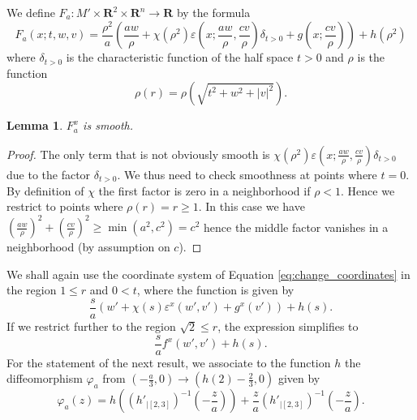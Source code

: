 \documentclass[reqno]{amsart}
\newcommand{\THOMAS}[1]%
	{\begin{quotation}{\footnotesize\textcolor{brown}{\textbf{Thomas:} #1}}\end{quotation}}
\renewcommand{\epsilon}{\varepsilon}
\theoremstyle{theorem}
\newtheorem{lemma}[corollary]{Lemma}
\theoremstyle{remark}
\theoremstyle{definition}
\DeclareMathOperator{\supp}{supp}
\newcommand{\R}{\mathbf{R}}
\begin{document}
We define $F_a:M' \times \R^2 \times \R^n \to \R$ by the formula
\[F_a(x;t,w,v)=\frac{\rho^2}{a}\left(\frac{aw}{\rho} + \chi(\rho^2)\epsilon\left(x;\frac{aw}{\rho},\frac{cv}{\rho}\right)\delta_{t>0}+g\left(x;\frac{cv}{\rho}\right)\right)+ h(\rho^2)\]
where $\delta_{t>0}$ is the characteristic function of the half space $t > 0 $ and $\rho$ is the function
\[\rho(r)=\rho\left(\sqrt{t^2+w^2+|v|^2}\right).\]






\begin{lemma} \label{lem:compact_support}
$F^x_a$ is smooth.%
\end{lemma}




\begin{proof}
  The only term that is not obviously smooth is $\chi(\rho^2)\epsilon\left(x;\frac{aw}{\rho},\frac{cv}{\rho}\right)\delta_{t>0}$ due to the factor $\delta_{t>0}$. We thus need to check smoothness at points where $t=0$. By definition of $\chi$ the first factor is zero in a neighborhood if $\rho<1$. Hence we restrict to points where $\rho(r)=r \geq 1$. In this case we have $(\frac{aw}{\rho})^2 + (\frac{cv}{\rho})^2 \geq \min(a^2,c^2)=c^2$ hence the middle factor vanishes in a neighborhood (by assumption on $c$).
\end{proof}


We shall again use the coordinate system of Equation \eqref{eq:change_coordinates} in the region $1 \leq r$ and   $0 <t $, where the function is given by
\begin{equation} \label{eq:quadratic_coordinates_G}
  \frac{s}{a}\left(w'+\chi(s)\epsilon^x(w',v')+g^x(v')\right)+h(s).
\end{equation}
If we restrict further to the region $\sqrt{2} \leq r$,
the expression simplifies to
\[\frac{s}{a}f^x(w',v')+h(s). \]
For the statement of the next result, we associate to the function $h$ the diffeomorphism $\varphi_a$ from $(-\frac{a}{3},0) \to (h(2)-\frac{2}{3},0)$ given by
\[\varphi_a(z)=h\left((h'_{\mid [2,3]})^{-1}\left( -\frac{z}{a}\right)\right)+\frac{z}{a}(h'_{\mid [2,3]})^{-1}\left(-\frac{z}{a}\right).\]
\end{document}
